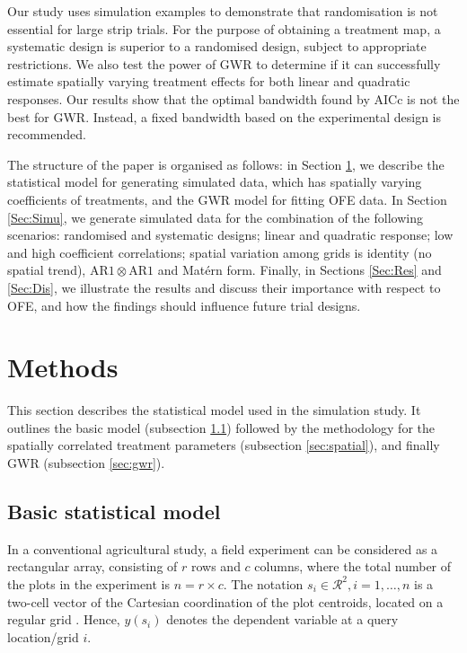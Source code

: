 \documentclass[a4paper]{article} 	%
\newcommand{\Matern}{Mat\'ern }
\newcommand{\AR}{\mathrm{AR1}}
\begin{document}

% 

Our study uses simulation examples to demonstrate that randomisation is not essential for large strip trials. For the purpose of obtaining a treatment map, a systematic design is superior to a randomised design, subject to appropriate restrictions. We also test the power of GWR to determine if it can successfully estimate spatially varying treatment effects for both linear and quadratic responses. Our results show that the optimal bandwidth found by AICc is not the best for GWR. Instead, a fixed bandwidth based on the experimental design is recommended.


The structure of the paper is organised as follows: in Section \ref{Sec:Meth}, we describe the statistical model for generating simulated data, which has spatially varying coefficients of treatments, and the GWR model for fitting OFE data. In Section \ref{Sec:Simu}, we generate simulated data for the combination of the following scenarios: randomised and systematic designs; linear and quadratic response; low and high coefficient correlations; spatial variation among grids is identity (no spatial trend), $\AR\otimes\AR$ and \Matern form. Finally, in Sections \ref{Sec:Res} and \ref{Sec:Dis}, we illustrate the results and discuss their importance with respect to OFE, and how the findings should influence future trial designs. 


\section{Methods}\label{Sec:Meth}

This section describes the statistical model used in the simulation study. It outlines the basic model (subsection \ref{sec:basic}) followed by the methodology for the spatially correlated treatment parameters (subsection \ref{sec:spatial}), and finally GWR (subsection \ref{sec:gwr}).


\subsection{Basic statistical model}\label{sec:basic}

In a conventional agricultural study, a field experiment can be considered as a rectangular array, consisting of $r$ rows and $c$ columns, where the total number of the plots in the experiment is $n=r\times c$. The notation $s_i\in \mathcal{R}^2, i=1,\ldots,n$ is a two-cell vector of the Cartesian coordination of the plot centroids, located on a regular grid \parencite{Zimmerman1991Randoma}. Hence, $y(s_i)$ denotes the dependent variable at a query location/grid $i$. 
	
\end{document}
